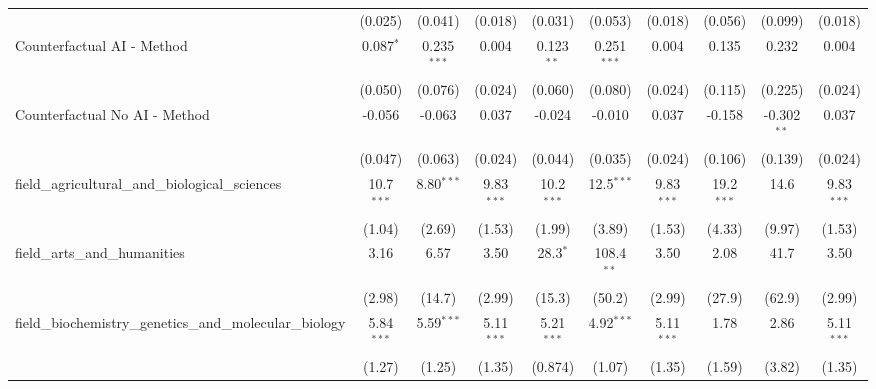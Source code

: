 \begin{tabular}{lccccccccc}
                                                               & (0.025)       & (0.041)       & (0.018)       & (0.031)       & (0.053)        & (0.018)       & (0.056)       & (0.099)        & (0.018)\\   
   Counterfactual AI - Method                                  & 0.087$^{*}$   & 0.235$^{***}$ & 0.004         & 0.123$^{**}$  & 0.251$^{***}$  & 0.004         & 0.135         & 0.232          & 0.004\\   
                                                               & (0.050)       & (0.076)       & (0.024)       & (0.060)       & (0.080)        & (0.024)       & (0.115)       & (0.225)        & (0.024)\\   
   Counterfactual No AI - Method                               & -0.056        & -0.063        & 0.037         & -0.024        & -0.010         & 0.037         & -0.158        & -0.302$^{**}$  & 0.037\\   
                                                               & (0.047)       & (0.063)       & (0.024)       & (0.044)       & (0.035)        & (0.024)       & (0.106)       & (0.139)        & (0.024)\\   
   field\_agricultural\_and\_biological\_sciences              & 10.7$^{***}$  & 8.80$^{***}$  & 9.83$^{***}$  & 10.2$^{***}$  & 12.5$^{***}$   & 9.83$^{***}$  & 19.2$^{***}$  & 14.6           & 9.83$^{***}$\\   
                                                               & (1.04)        & (2.69)        & (1.53)        & (1.99)        & (3.89)         & (1.53)        & (4.33)        & (9.97)         & (1.53)\\   
   field\_arts\_and\_humanities                                & 3.16          & 6.57          & 3.50          & 28.3$^{*}$    & 108.4$^{**}$   & 3.50          & 2.08          & 41.7           & 3.50\\   
                                                               & (2.98)        & (14.7)        & (2.99)        & (15.3)        & (50.2)         & (2.99)        & (27.9)        & (62.9)         & (2.99)\\   
   field\_biochemistry\_genetics\_and\_molecular\_biology      & 5.84$^{***}$  & 5.59$^{***}$  & 5.11$^{***}$  & 5.21$^{***}$  & 4.92$^{***}$   & 5.11$^{***}$  & 1.78          & 2.86           & 5.11$^{***}$\\   
                                                               & (1.27)        & (1.25)        & (1.35)        & (0.874)       & (1.07)         & (1.35)        & (1.59)        & (3.82)         & (1.35)\\   

\end{tabular}
